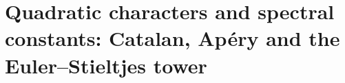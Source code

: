 \chapter{Quadratic characters and spectral constants: Catalan, Apéry and the Euler--Stieltjes tower}
\label{chap:p3-final:41:catalan_apery_euler}


